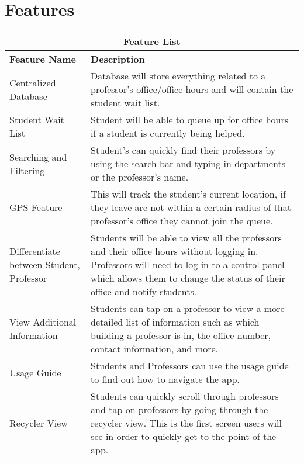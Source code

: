 \documentclass[11pt]{article} %
\begin{document}
\section{Features}

\begin{tabular}{ |p{7cm}|p{9cm}|  }
\hline
\multicolumn{2}{|c|}{Feature List} \\
\hline
\bfseries{Feature Name}& \bfseries{Description} \\
\hline
Centralized Database & Database will store everything related to a professor's office/office hours and will contain the student wait list.\\
\hline
Student Wait List & Student will be able to queue up for office hours if a student is currently being helped.\\
\hline
Searching and Filtering & Student's can quickly find their professors by using the search bar and typing in departments or the professor's name.\\
\hline
GPS Feature & This will track the student's current location, if they leave are not within a certain radius of that professor's office they cannot join the queue.\\
\hline
Differentiate between Student, Professor & Students will be able to view all the professors and their office hours without logging in. Professors will need to log-in to a control panel which allows them to change the status of their office and notify students.\\
\hline
View Additional Information & Students can tap on a professor to view a more detailed list of information such as which building a professor is in, the office number, contact information, and more.\\
\hline
Usage Guide & Students and Professors can use the usage guide to find out how to navigate the app.\\
\hline
Recycler View & Students can quickly scroll through professors and tap on professors by going through the recycler view. This is the first screen users will see in order to quickly get to the point of the app.\\
\hline
\end{tabular}
\end{document}
